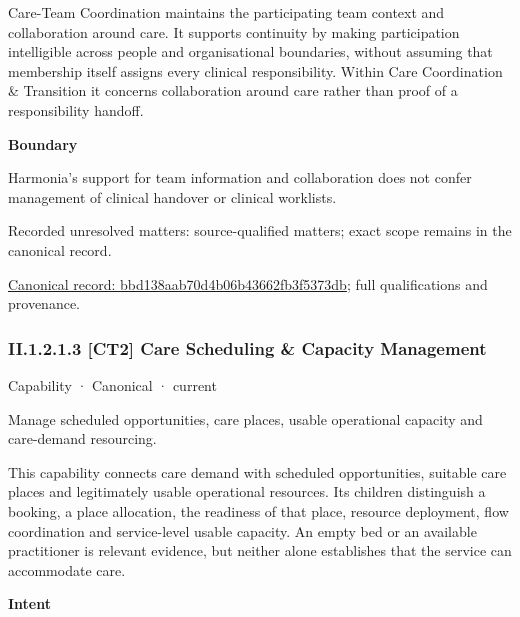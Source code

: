Care-Team Coordination maintains the participating team context and collaboration around care. It supports continuity by making participation intelligible across people and organisational boundaries, without assuming that membership itself assigns every clinical responsibility. Within Care Coordination \& Transition it concerns collaboration around care rather than proof of a responsibility handoff.



\textbf{Boundary}



Harmonia's support for team information and collaboration does not confer management of clinical handover or clinical worklists.


{\small Recorded unresolved matters: source-qualified matters; exact scope remains in the canonical record.}\par
{\footnotesize \href{../../../../../../../continuum/strategy/capability/bbd138aab70d4b06b43662fb3f5373db.md}{Canonical record: bbd138aab70d4b06b43662fb3f5373db}; full qualifications and provenance.}\par
\subsubsection*{II.1.2.1.3 [CT2] Care Scheduling \& Capacity Management}
\label{navigation:II.1.2.1.3}

\label{element:61dd4b247df14546bf012587164bfe91}
{\small Capability · Canonical · current}\par

Manage scheduled opportunities, care places, usable operational capacity and care-demand resourcing.



This capability connects care demand with scheduled opportunities, suitable care places and legitimately usable operational resources. Its children distinguish a booking, a place allocation, the readiness of that place, resource deployment, flow coordination and service-level usable capacity. An empty bed or an available practitioner is relevant evidence, but neither alone establishes that the service can accommodate care.



\textbf{Intent}



